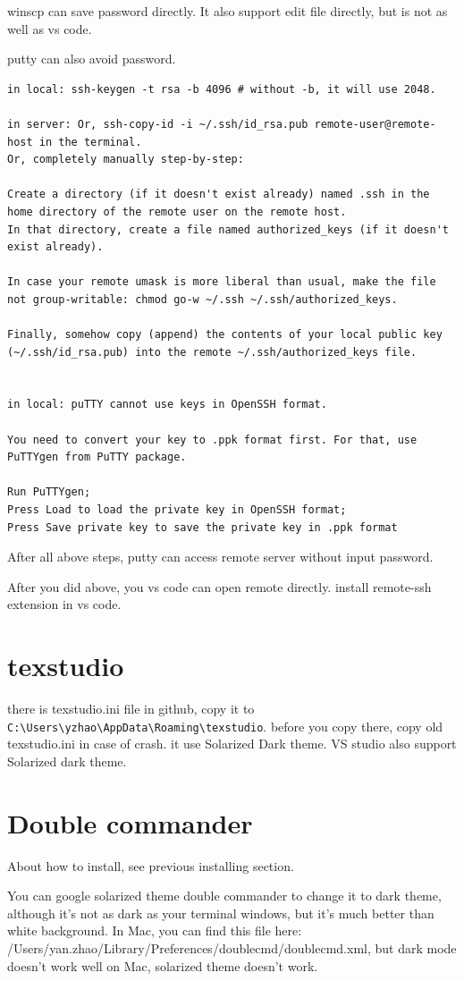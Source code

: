 \documentclass[paper=8.5in:11in, twoside, 12pt, pagesize=pdftex]{book}
\begin{document}
	winscp can save password directly. It also support edit file directly, but is not as well as vs code. 
	
	putty can also avoid password. 
\begin{verbatim}
in local: ssh-keygen -t rsa -b 4096 # without -b, it will use 2048.

in server: Or, ssh-copy-id -i ~/.ssh/id_rsa.pub remote-user@remote-host in the terminal. 
Or, completely manually step-by-step:

Create a directory (if it doesn't exist already) named .ssh in the home directory of the remote user on the remote host.
In that directory, create a file named authorized_keys (if it doesn't exist already).

In case your remote umask is more liberal than usual, make the file not group-writable: chmod go-w ~/.ssh ~/.ssh/authorized_keys.

Finally, somehow copy (append) the contents of your local public key (~/.ssh/id_rsa.pub) into the remote ~/.ssh/authorized_keys file.


in local: puTTY cannot use keys in OpenSSH format.

You need to convert your key to .ppk format first. For that, use PuTTYgen from PuTTY package.

Run PuTTYgen;
Press Load to load the private key in OpenSSH format;
Press Save private key to save the private key in .ppk format
\end{verbatim}
	After all above steps, putty can access remote server without input password.  

	After you did above, you vs code can open remote directly.  install remote-ssh extension in vs code.
	
	 
\section{texstudio}
there is texstudio.ini file in github, copy it to \verb|C:\Users\yzhao\AppData\Roaming\texstudio|. before you copy there, copy old texstudio.ini in case of crash. it use Solarized Dark theme. VS studio also support Solarized dark theme. 

\section{Double commander}
 About how to install, see previous installing section.
	
You can google solarized theme double commander to change it to dark theme, although it's not as dark as your terminal windows, but it's much better than white background.  In Mac, you can find this file here: /Users/yan.zhao/Library/Preferences/doublecmd/doublecmd.xml, but dark mode doesn't work well on Mac, solarized theme doesn't work.
	
\end{document}
